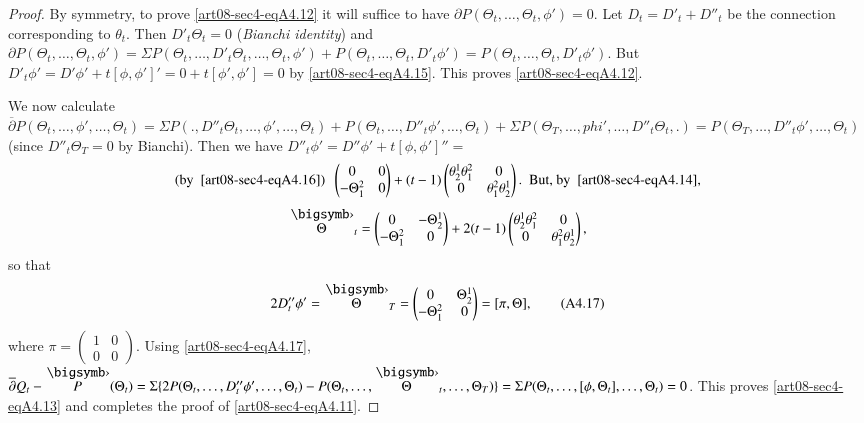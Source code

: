 \begin{proof}
By symmetry, to prove \eqref{art08-sec4-eqA4.12} it will suffice to have $\partial P(\Theta_{t},\ldots,\Theta_{t},\phi')=0$. Let $D_{t}=D'_{t}+D''_{t}$ be the connection corresponding to $\theta_{t}$. Then $D'_{t}\Theta_{t}=0$ (\textit{Bianchi identity}) and $\partial P(\Theta_{t},\ldots,\Theta_{t},\phi')=\Sigma P(\Theta_{t},\ldots,D'_{t}\Theta_{t},\ldots,\Theta_{t},\phi')+P(\Theta_{t},\ldots,\Theta_{t},D'_{t}\phi')=P(\Theta_{t},\ldots,\Theta_{t},D'_{t}\phi')$. But $D'_{t}\phi'=D'\phi'+t[\phi,\phi']'=0+t[\phi',\phi']=0$ by \eqref{art08-sec4-eqA4.15}. This proves \eqref{art08-sec4-eqA4.12}.

We now calculate $\overline{\partial}P(\Theta_{t},\ldots,\phi',\ldots,\Theta_{t})=\Sigma P(.,D''_{t}\Theta_{t},\ldots,\phi',\ldots,\Theta_{t})+P(\Theta_{t},\ldots,D''_{t}\phi',\ldots,\Theta_{t})+\Sigma P(\Theta_{T},\ldots,phi',\ldots,D''_{t}\Theta_{t},.)=P(\Theta_{T},\ldots,D''_{t}\phi',\ldots,\Theta_{t})$ (since $D''_{t}\Theta_{T}=0$ by Bianchi). Then we have $D''_{t}\phi'=D''\phi'+t[\phi,\phi']''=$
\begin{gather*}
(\text{by~ \eqref{art08-sec4-eqA4.16}}) \ \ \left(\begin{matrix} 0 & 0 \\ -\Theta^{2}_{1} & 0\end{matrix}\right)+(t-1)\left(\begin{matrix} \theta^{1}_{2} \theta^{2}_{1} & 0 \\ 0 & \theta^{2}_{1}\theta^{1}_{2}\end{matrix}\right). \ \ \text{But, by~ \eqref{art08-sec4-eqA4.14},}\\[3pt]
\overdot{\Theta}_{t}=\left(\begin{matrix} 0 & -\Theta^{1}_{2}\\ - \Theta^{2}_{1} & 0\end{matrix}\right)+2(t-1)\left(\begin{matrix} \theta^{1}_{2}\theta^{2}_{1} & 0\\ 0 & \theta^{2}_{1}\theta^{1}_{2}\end{matrix}\right),
\end{gather*}
so that
\begin{equation*}
2D''_{t}\phi'=\overdot{\Theta}_{T}=\left(\begin{matrix} 0 & \Theta^{1}_{2}\\ -\Theta^{2}_{1} & 0\end{matrix}\right)=[\pi,\Theta],\tag{A4.17}\label{art08-sec4-eqA4.17}
\end{equation*}
where $\pi=\left(\begin{smallmatrix} 1 & 0\\ 0 & 0\end{smallmatrix}\right)$. Using \eqref{art08-sec4-eqA4.17}, $\overline{\partial}Q_{t}-\overdot{P}(\Theta_{t})=\Sigma\{2P(\Theta_{t},\ldots,D''_{t}\phi',\ldots,\Theta_{t})-P(\Theta_{t},\ldots,\overdot{\Theta}_{t},\ldots,\Theta_{T})\}=\Sigma P(\Theta_{t},\ldots,[\phi,\Theta_{t}],\ldots,\Theta_{t})=0$. This proves \eqref{art08-sec4-eqA4.13} and completes the proof of \eqref{art08-sec4-eqA4.11}.
\end{proof}

